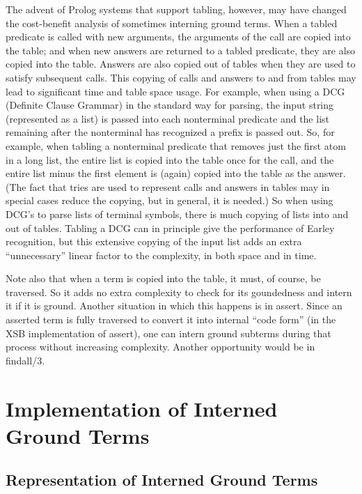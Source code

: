 \documentclass{llncs}
\begin{document}
The advent of Prolog systems that support tabling, however, may have
changed the cost-benefit analysis of sometimes interning ground terms.
When a tabled predicate is called with new arguments, the arguments of
the call are copied into the table; and when new answers are returned
to a tabled predicate, they are also copied into the table.  Answers
are also copied out of tables when they are used to satisfy subsequent
calls.  This copying of calls and answers to and from tables may lead
to significant time and table space usage.  For example, when using a
DCG (Definite Clause Grammar) in the standard way for parsing, the
input string (represented as a list) is passed into each nonterminal
predicate and the list remaining after the nonterminal has recognized
a prefix is passed out.  So, for example, when tabling a nonterminal
predicate that removes just the first atom in a long list, the entire
list is copied into the table once for the call, and the entire list
minus the first element is (again) copied into the table as the
answer.  (The fact that tries are used to represent calls and answers
in tables may in special cases reduce the copying, but in general, it
is needed.)  So when using DCG's to parse lists of terminal symbols,
there is much copying of lists into and out of tables.  Tabling a DCG
can in principle give the performance of Earley recognition, but this
extensive copying of the input list adds an extra ``unnecessary''
linear factor to the complexity, in both space and in time.

Note also that when a term is copied into the table, it must, of
course, be traversed.  So it adds no extra complexity to check for its
goundedness and intern it if it is ground.  Another situation in which
this happens is in assert.  Since an asserted term is fully traversed
to convert it into internal ``code form'' (in the XSB implementation
of assert), one can intern ground subterms during that process without
increasing complexity.  Another opportunity would be in findall/3.



\section{Implementation of Interned Ground Terms}

\subsection{Representation of Interned Ground Terms}
\end{document}
